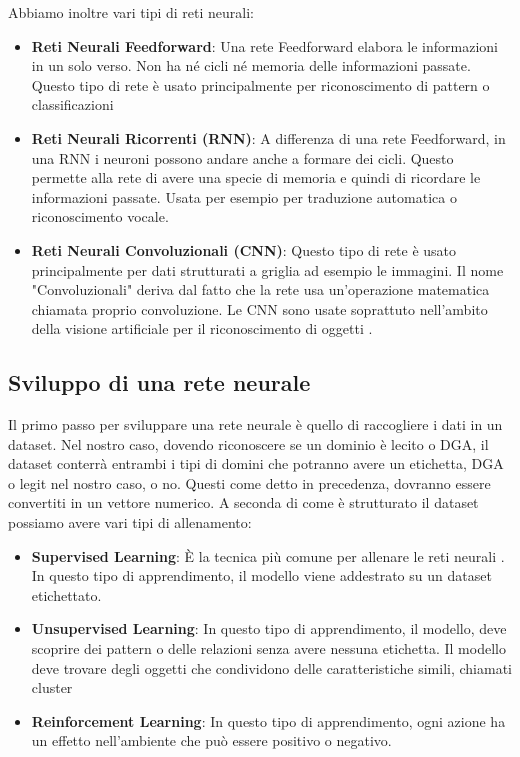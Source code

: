 \documentclass[12pt,a4paper,openright,twoside]{book}
\begin{document}
Abbiamo inoltre vari tipi di reti neurali:
\begin{itemize}
    \item \textbf{Reti Neurali Feedforward}: Una rete Feedforward
    elabora le informazioni in un solo verso. Non ha né cicli
    né memoria delle informazioni passate. Questo tipo di rete
    è usato principalmente per riconoscimento di pattern o classificazioni
    \item \textbf{Reti Neurali Ricorrenti (RNN)}:
    A differenza di una rete Feedforward, in una RNN 
    i neuroni possono andare anche a formare dei cicli. 
    Questo permette alla rete di avere una specie di memoria
    e quindi di ricordare le informazioni passate. Usata
    per esempio per traduzione automatica o riconoscimento vocale.
    \item \textbf{Reti Neurali Convoluzionali (CNN)}: Questo tipo di rete
    è usato principalmente per dati strutturati a griglia ad esempio le immagini.
    Il nome "Convoluzionali" deriva dal fatto che la
    rete usa un'operazione matematica chiamata proprio
    convoluzione. Le CNN sono usate soprattuto nell'ambito della
    visione artificiale per il riconoscimento di oggetti
    \cite{Goodfellow-et-al-2016}.
\end{itemize}

\subsection{Sviluppo di una rete neurale}
Il primo passo per sviluppare una rete neurale è quello di
raccogliere i dati in un dataset. Nel nostro caso, dovendo riconoscere se un dominio
è lecito o \acrshort{DGA}, il dataset conterrà
entrambi i tipi di domini che potranno avere un etichetta, DGA o legit nel nostro caso, o no. Questi come detto in precedenza,
dovranno essere convertiti in un vettore numerico. A seconda di come
è strutturato il dataset possiamo avere vari tipi di allenamento:

\begin{itemize}
    \item \textbf{Supervised Learning}: È la tecnica più comune
    per allenare le reti neurali \cite{ayodele2010types}. In questo tipo di apprendimento,
    il modello viene addestrato su un dataset etichettato.
    \item \textbf{Unsupervised Learning}: In questo tipo di apprendimento,
    il modello, deve scoprire dei pattern o delle relazioni
    senza avere nessuna etichetta. Il modello deve trovare
    degli oggetti che condividono delle caratteristiche simili, chiamati
    cluster
    \item \textbf{Reinforcement Learning}: In questo tipo di apprendimento,
    ogni azione ha un effetto nell'ambiente che può essere positivo
    o negativo.
\end{itemize}
\end{document}
